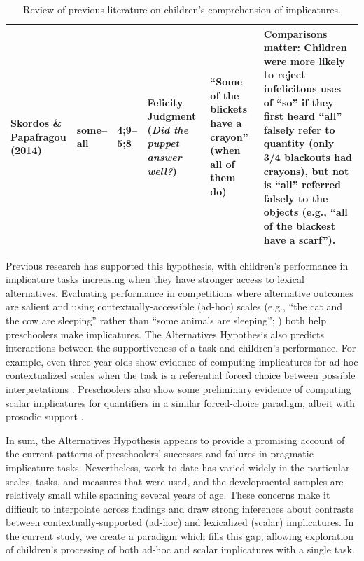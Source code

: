 \documentclass[man]{apa2}
\begin{document}
\begin{landscape}
\begin{table}
\begin{tabular}{| p{2.2cm} | p{2cm} | p{1.69cm} | p{4.5cm} | p{5cm} | p{7.2cm} |}
\parbox[t]{2.2cm}{Skordos \&\\Papafragou (2014)} & some--all & 4;9--5;8 & Felicity Judgment (\textit{Did the puppet answer well?}) & ``Some of the blickets have a crayon'' (when all of them do)  & Comparisons matter: Children were more likely to reject infelicitous uses of ``so'' if they first heard ``all'' falsely refer to quantity (only 3/4 blackouts had crayons), but not is ``all'' referred falsely to the objects (e.g., ``all of the blackest have a scarf'').\\ \hline \end{tabular} 
\caption{\label{tab:lit_review}Review of previous literature on children's comprehension of implicatures.} 
\end{table}
\end{landscape}
\restoregeometry

Previous research has supported this hypothesis, with children's performance in implicature tasks increasing when they have stronger access to lexical alternatives. Evaluating performance in competitions where alternative outcomes are salient \cite{papafragou2003} and using contextually-accessible (ad-hoc) scales (e.g., ``the cat and the cow are sleeping'' rather than ``some animals are sleeping''; ) both help preschoolers make implicatures. The Alternatives Hypothesis also predicts interactions between the supportiveness of a task and children's performance. For example, even three-year-olds show evidence of computing implicatures for ad-hoc contextualized scales when the task is a referential forced choice between possible interpretations \cite{stiller2014}.  Preschoolers also show some preliminary evidence of computing scalar implicatures for quantifiers in a similar forced-choice paradigm, albeit with prosodic support \cite{miller2005}. 

In sum, the Alternatives Hypothesis appears to provide a promising account of the current patterns of preschoolers' successes and failures in pragmatic implicature tasks. Nevertheless, work to date has varied widely in the particular scales, tasks, and measures that were used, and the developmental samples are relatively small while spanning several years of age. These concerns make it difficult to interpolate across findings and draw strong inferences about contrasts between contextually-supported (ad-hoc) and lexicalized (scalar) implicatures. In the current study, we create a paradigm which fills this gap, allowing exploration of children's processing of both ad-hoc and scalar implicatures with a single task.
\end{document}
